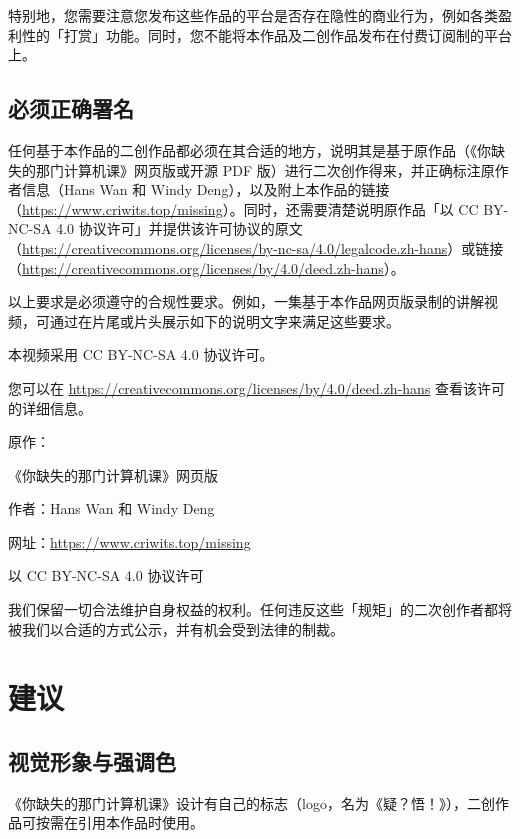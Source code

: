 特别地，您需要注意您发布这些作品的平台是否存在隐性的商业行为，例如各类盈利性的「打赏」功能。同时，您不能将本作品及二创作品发布在付费订阅制的平台上。

\subsection{必须正确署名}

任何基于本作品的二创作品都必须在其合适的地方，说明其是基于原作品（《你缺失的那门计算机课》网页版或开源 PDF 版）进行二次创作得来，并正确标注原作者信息（Hans Wan 和 Windy Deng），以及附上本作品的链接（\url{https://www.criwits.top/missing}）。同时，还需要清楚说明原作品「以 CC BY-NC-SA 4.0 协议许可」并提供该许可协议的原文（\url{https://creativecommons.org/licenses/by-nc-sa/4.0/legalcode.zh-hans}）或链接（\url{https://creativecommons.org/licenses/by/4.0/deed.zh-hans}）。

以上要求是必须遵守的合规性要求。例如，一集基于本作品网页版录制的讲解视频，可通过在片尾或片头展示如下的说明文字来满足这些要求。

\begin{quoting}
  本视频采用 CC BY-NC-SA 4.0 协议许可。\par
  您可以在 \url{https://creativecommons.org/licenses/by/4.0/deed.zh-hans} 查看该许可的详细信息。\par
  \phantom{六}\par
  原作：\par
  《你缺失的那门计算机课》网页版\par
  作者：Hans Wan 和 Windy Deng\par
  网址：\url{https://www.criwits.top/missing}\par
  以 CC BY-NC-SA 4.0 协议许可\par
\end{quoting}

我们保留一切合法维护自身权益的权利。任何违反这些「规矩」的二次创作者都将被我们以合适的方式公示，并有机会受到法律的制裁。

\section{建议}

\subsection{视觉形象与强调色}

《你缺失的那门计算机课》设计有自己的标志（logo，名为《疑？悟！》），二创作品可按需在引用本作品时使用。


